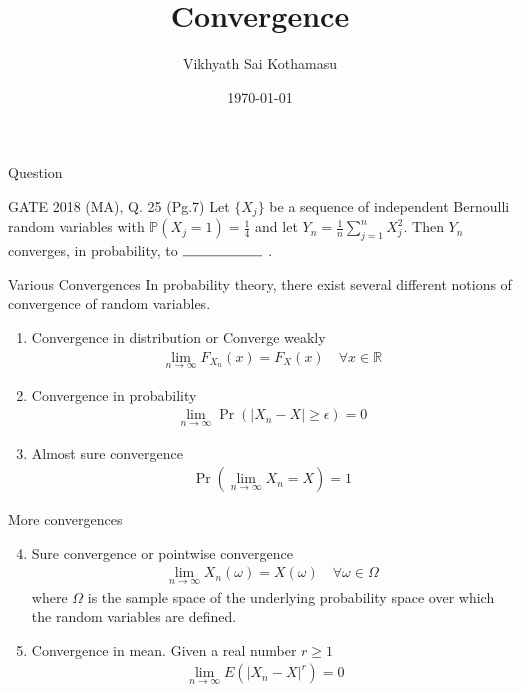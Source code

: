 \documentclass{beamer}
\title{Convergence}
\author{Vikhyath Sai Kothamasu}
\institute{IITH}
\date{\today}
\providecommand{\abs}[1]{\vert#1\vert}
\begin{document}
\begin{frame}
\titlepage
\end{frame}
\begin{frame}{Question}
\begin{block}{GATE 2018 (MA), Q. 25 (Pg.7)}
Let $\{X_j\}$ be a sequence of independent Bernoulli random variables with $\mathbb{P}(X_j=1) = \frac{1}{4}$ and let $Y_n = \frac{1}{n} \sum_{j=1}^{n}X_j^2$. Then $Y_n$ converges, in probability, to $\rule{2cm}{0.15mm}$ .
\end{block}
\end{frame}
\begin{frame}{Various Convergences}
In probability theory, there exist several different notions of convergence of random variables.
\begin{enumerate}
    \item Convergence in distribution or Converge weakly 
        \begin{align}
            \lim_{n\rightarrow\infty}F_{X_n}(x) = F_X(x) \quad \forall x \in \mathbb{R}
        \end{align}
    \item Convergence in probability
        \begin{align}
            \lim_{n\rightarrow\infty} \Pr{(\abs{X_n-X} \geq \epsilon)} = 0
        \end{align}
    \item Almost sure convergence
        \begin{align}
            \Pr{(\lim_{n\rightarrow\infty}X_n=X)} = 1
        \end{align}
\end{enumerate}
\end{frame}
\begin{frame}{More convergences}
\begin{enumerate}
  \setcounter{enumi}{3}
  \item Sure convergence or pointwise convergence
    \begin{align}
        \lim_{n\rightarrow\infty} X_n(\omega) = X(\omega) \quad \forall \omega \in \Omega
    \end{align}
    where $\Omega$ is the sample space of the underlying probability space over which the random variables are defined.
    \item Convergence in mean. Given a real number $r\geq 1$
        \begin{align}
            \lim_{n\rightarrow\infty}E(\abs{X_n-X}^r) = 0 \quad 
        \end{align}
\end{enumerate}
\end{frame}
\end{document}
